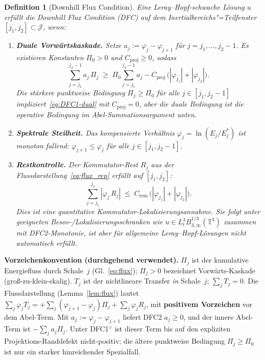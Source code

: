 \documentclass[12pt,a4paper]{article}
\theoremstyle{breakdef}
\newtheorem{definition}{Definition}[section]
\theoremstyle{breakplain}
\theoremstyle{breakdef}
\begin{document}
\begin{definition}[Downhill Flux Condition]\label{def:DFC}
Eine Leray--Hopf-schwache Lösung $u$ erfüllt die \emph{Downhill Flux
Condition} (DFC) auf dem Inertialbereichs"=Teilfenster
$[j_1, j_2] \subset \mathcal{J}$, wenn:
\begin{enumerate}
  \item[\textup{(DFC1$^\vee$)}] \textbf{Duale Vorwärtskaskade.}\quad
    Setze $a_j := \varphi_j-\varphi_{j+1}$ für
    $j=j_1,\ldots,j_2-1$. Es existieren Konstanten
    $\Pi_0>0$ und $C_{\mathrm{proj}}\ge0$, sodass
    \begin{equation}\label{eq:DFC1-dual}
      \sum_{j=j_1}^{j_2-1} a_j\,\Pi_j
      \;\ge\;
      \Pi_0\sum_{j=j_1}^{j_2-1} a_j
      -
      C_{\mathrm{proj}}\,
      \bigl(|\varphi_{j_1}|+|\varphi_{j_2}|\bigr).
    \end{equation}
    Die stärkere punktweise Bedingung $\Pi_j\ge\Pi_0$ für alle
    $j\in[j_1,j_2-1]$ impliziert~\eqref{eq:DFC1-dual} mit
    $C_{\mathrm{proj}}=0$, aber die duale Bedingung ist die operative
    Bedingung im Abel-Summationsargument unten.
  \item[\textup{(DFC2)}] \textbf{Spektrale Steilheit.}\quad
    Das kompensierte Verhältnis $\varphi_j = \ln(E_j/E_j^*)$ ist
    monoton fallend:
    $\varphi_{j+1} \le \varphi_j$ für alle $j \in [j_1, j_2-1]$.
  \item[\textup{(DFC3)}] \textbf{Restkontrolle.}\quad
    Der Kommutator-Rest $R_j$ aus der
    Flussdarstellung~\eqref{eq:flux_rep} erfüllt auf $[j_1, j_2]$:
    \begin{equation}\label{eq:DFC3-concrete}
      \sum_{j=j_1}^{j_2} |\varphi_j\,R_j|
      \;\le\;
      C_{\mathrm{rem}}\,
      \bigl(|\varphi_{j_1}| + |\varphi_{j_2}|\bigr).
    \end{equation}
    Dies ist eine quantitative Kommutator-Lokalisierungsannahme. Sie folgt
    unter geeigneten Besov-/Lokalisierungsschranken wie
    $u \in L^3_t B^{1/3}_{3,\infty}(\mathbb{T}^3)$ zusammen mit
    DFC2-Monotonie, ist aber für allgemeine Leray--Hopf-Lösungen nicht
    automatisch erfüllt.
\end{enumerate}
\end{definition}

\noindent
\textbf{Vorzeichenkonvention (durchgehend verwendet).}\quad
$\Pi_j$ ist der kumulative Energiefluss durch Schale~$j$
(Gl.~\eqref{eq:flux}); $\Pi_j > 0$ bezeichnet Vorwärts-Kaskade
(groß-zu-klein-skalig). $T_j$ ist der nichtlineare Transfer \emph{in}
Schale~$j$; $\sum_j T_j = 0$. Die Flussdarstellung
(Lemma~\ref{lem:flux}) lautet
$\sum_j \varphi_j T_j = +\sum_j(\varphi_{j+1}-\varphi_j)\Pi_j +
\sum_j \varphi_j R_j$, mit \textbf{positivem Vorzeichen} vor dem
Abel-Term. Mit $a_j:=\varphi_j-\varphi_{j+1}$ liefert DFC2 $a_j\ge0$,
und der innere Abel-Term ist $-\sum_j a_j\Pi_j$. Unter DFC1$^\vee$ ist
dieser Term bis auf den expliziten Projektions-Randdefekt nicht-positiv;
die ältere punktweise Bedingung $\Pi_j\ge\Pi_0$ ist nur ein starker
hinreichender Spezialfall.
\end{document}
